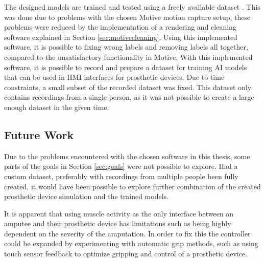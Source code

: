 \documentclass[../main.tex]{subfiles}
\begin{document}
The designed models are trained and tested using a freely available dataset \cite{kinmusdataset}.
This was done due to problems with the chosen Motive motion capture \cite{motive} setup, these problems were reduced by the implementation of a rendering and cleaning software explained in Section \ref{sec:motivecleaning}.
Using this implemented software, it is possible to fixing wrong labels and removing labels all together, compared to the unsatisfactory functionality in Motive.
With this implemented software, it is possible to record and prepare a dataset for training \gls{AI} models that can be used in \gls{HMI} interfaces for prosthetic devices.
Due to time constraints, a small subset of the recorded dataset was fixed.
This dataset only contains recordings from a single person, as it was not possible to create a large enough dataset in the given time. 





\newpage
\subsection{Future Work}

Due to the problems encountered with the chosen software in this thesis, some parts of the goals in Section \ref{sec:goals} were not possible to explore.
Had a custom dataset, preferably with recordings from multiple people been fully created, it would have been possible to explore further combination of the created prosthetic device simulation and the trained models.

It is apparent that using muscle activity as the only interface between an amputee and their prosthetic device has limitations such as being highly dependent on the severity of the amputation.
In order to fix this the controller could be expanded by experimenting with automatic grip methods, such as using touch sensor feedback to optimize gripping and control of a prosthetic device.
\end{document}

